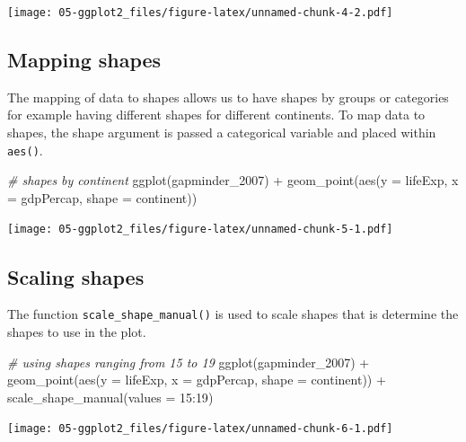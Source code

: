 \documentclass[
]{book}
\newenvironment{Shaded}{\begin{snugshade}}{\end{snugshade}}
\newcommand{\AttributeTok}[1]{\textcolor[rgb]{0.77,0.63,0.00}{#1}}
\newcommand{\CommentTok}[1]{\textcolor[rgb]{0.56,0.35,0.01}{\textit{#1}}}
\newcommand{\DecValTok}[1]{\textcolor[rgb]{0.00,0.00,0.81}{#1}}
\newcommand{\FunctionTok}[1]{\textcolor[rgb]{0.00,0.00,0.00}{#1}}
\newcommand{\NormalTok}[1]{#1}
\newcommand{\SpecialCharTok}[1]{\textcolor[rgb]{0.00,0.00,0.00}{#1}}
\begin{document}
\texttt{[image: 05-ggplot2\_files/figure-latex/unnamed-chunk-4-2.pdf]}

\hypertarget{mapping-shapes}{%
\subsection{Mapping shapes}\label{mapping-shapes}}

The mapping of data to shapes allows us to have shapes by groups or categories for example having different shapes for different continents. To map data to shapes, the shape argument is passed a categorical variable and placed within \texttt{aes()}.

\begin{Shaded}
\begin{Highlighting}[]
\CommentTok{\# shapes by continent}
\FunctionTok{ggplot}\NormalTok{(gapminder\_2007) }\SpecialCharTok{+} 
  \FunctionTok{geom\_point}\NormalTok{(}\FunctionTok{aes}\NormalTok{(}\AttributeTok{y =}\NormalTok{ lifeExp, }\AttributeTok{x =}\NormalTok{ gdpPercap, }\AttributeTok{shape =}\NormalTok{ continent))}
\end{Highlighting}
\end{Shaded}

\texttt{[image: 05-ggplot2\_files/figure-latex/unnamed-chunk-5-1.pdf]}

\hypertarget{scaling-shapes}{%
\subsection{Scaling shapes}\label{scaling-shapes}}

The function \texttt{scale\_shape\_manual()} is used to scale shapes that is determine the shapes to use in the plot.

\begin{Shaded}
\begin{Highlighting}[]
\CommentTok{\# using shapes ranging from 15 to 19}
\FunctionTok{ggplot}\NormalTok{(gapminder\_2007) }\SpecialCharTok{+} 
  \FunctionTok{geom\_point}\NormalTok{(}\FunctionTok{aes}\NormalTok{(}\AttributeTok{y =}\NormalTok{ lifeExp, }\AttributeTok{x =}\NormalTok{ gdpPercap, }\AttributeTok{shape =}\NormalTok{ continent)) }\SpecialCharTok{+}
  \FunctionTok{scale\_shape\_manual}\NormalTok{(}\AttributeTok{values =} \DecValTok{15}\SpecialCharTok{:}\DecValTok{19}\NormalTok{)}
\end{Highlighting}
\end{Shaded}

\texttt{[image: 05-ggplot2\_files/figure-latex/unnamed-chunk-6-1.pdf]}
\end{document}
